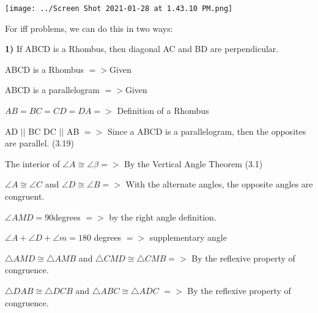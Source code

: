 \documentclass{article}
\begin{document}
\vspace{2mm}

\texttt{[image: ../Screen Shot 2021-01-28 at 1.43.10 PM.png]}

For iff problems, we can do this in two ways:

\vspace{2mm}

	\textbf{1)} If ABCD is a Rhombus, then diagonal AC and BD are perpendicular.
	\vspace{2mm}

ABCD is a Rhombus  $=> $Given 
\vspace{2mm}

ABCD is a parallelogram  $=> $Given 

\vspace{2mm}

$AB=BC=CD=DA =>$ Definition of a Rhombus

\vspace{2mm}

AD $||$ BC  DC $||$ AB $= >$ Since a ABCD is a parallelogram, then the opposites are parallel. (3.19)

\vspace{2mm}


The interior of $\angle{A} \displaystyle \cong \angle{\beta} = > $ By the Vertical Angle Theorem (3.1)

\vspace{2mm}


$\angle{A} \displaystyle \cong \angle{C}$ and $\angle{D} \displaystyle \cong \angle{B} => $ With the alternate angles, the opposite angles are congruent. 

\vspace{2mm}


$\angle{AMD}= 90 $degrees $= >$ by the right angle definition.

\vspace{2mm}


$\angle{A} + \angle{D} + \angle{m}=180$ degrees $=>$ supplementary angle 

\vspace{2mm}



$\triangle{AMD} \displaystyle \cong \triangle{AMB}$ and $\triangle{CMD} \displaystyle \cong \triangle{CMB} = > $ By the reflexive property of congruence. 

\vspace{2mm}


 $\triangle{DAB} \displaystyle \cong \triangle{DCB}$ and $\triangle{ABC} \displaystyle \cong \triangle{ADC}$ $= >$ By the reflexive property of congruence. 
 
\end{document}
